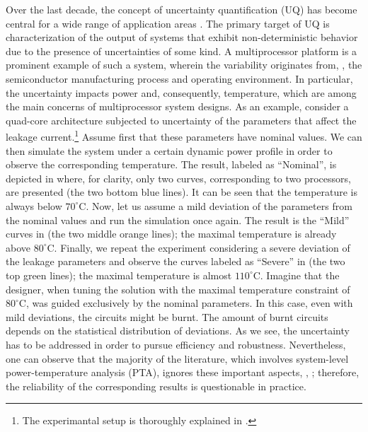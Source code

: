 Over the last decade, the concept of uncertainty quantification (UQ) has become central for a wide range of application areas \cite{xiu2010, eldred2009}. The primary target of UQ is characterization of the output of systems that exhibit non-deterministic behavior due to the presence of uncertainties of some kind. A multiprocessor platform is a prominent example of such a system, wherein the variability originates from, \eg, the semiconductor manufacturing process and operating environment. In particular, the uncertainty impacts power and, consequently, temperature, which are among the main concerns of multiprocessor system designs. As an example, consider a quad-core architecture subjected to uncertainty of the parameters that affect the leakage current.\footnote{The experimantal setup is thoroughly explained in .} Assume first that these parameters have nominal values. We can then simulate the system under a certain dynamic power profile in order to observe the corresponding temperature. The result, labeled as ``Nominal'', is depicted in  where, for clarity, only two curves, corresponding to two processors, are presented (the two bottom blue lines). It can be seen that the temperature is always below $70^{\circ}$C. Now, let us assume a mild deviation of the parameters from the nominal values and run the simulation once again. The result is the ``Mild'' curves in  (the two middle orange lines); the maximal temperature is already above $80^{\circ}$C. Finally, we repeat the experiment considering a severe deviation of the leakage parameters and observe the curves labeled as ``Severe'' in  (the two top green lines); the maximal temperature is almost $110^{\circ}$C. Imagine that the designer, when tuning the solution with the maximal temperature constraint of $80^\circ$C, was guided exclusively by the nominal parameters. In this case, even with mild deviations, the circuits might be burnt. The amount of burnt circuits depends on the statistical distribution of deviations. As we see, the uncertainty has to be addressed in order to pursue efficiency and robustness. Nevertheless, one can observe that the majority of the literature, which involves system-level power-temperature analysis (PTA), ignores these important aspects, \eg, \cite{rao2009, rai2011, thiele2011, ukhov2012}; therefore, the reliability of the corresponding results is questionable in practice.

